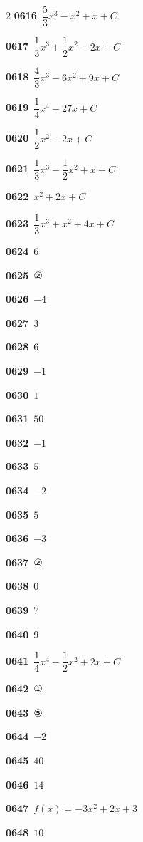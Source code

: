 \documentclass[10pt,a4paper]{article}
\begin{document}
\begin{multicols}{2}
\noindent\textbf{0616}\ $\dfrac{5}{3}x^3-x^2+x+C$\par
\noindent\textbf{0617}\ $\dfrac{1}{3}x^3+\dfrac{1}{2}x^2-2x+C$\par
\noindent\textbf{0618}\ $\dfrac{4}{3}x^3-6x^2+9x+C$\par
\noindent\textbf{0619}\ $\dfrac{1}{4}x^4-27x+C$\par
\noindent\textbf{0620}\ $\dfrac{1}{2}x^2-2x+C$\par
\noindent\textbf{0621}\ $\dfrac{1}{3}x^3-\dfrac{1}{2}x^2+x+C$\par
\noindent\textbf{0622}\ $x^2+2x+C$\par
\noindent\textbf{0623}\ $\dfrac{1}{3}x^3+x^2+4x+C$\par
\noindent\textbf{0624}\ $6$\par
\noindent\textbf{0625}\ ②\par
\noindent\textbf{0626}\ $-4$\par
\noindent\textbf{0627}\ $3$\par
\noindent\textbf{0628}\ $6$\par
\noindent\textbf{0629}\ $-1$\par
\noindent\textbf{0630}\ $1$\par
\noindent\textbf{0631}\ $50$\par
\noindent\textbf{0632}\ $-1$\par
\noindent\textbf{0633}\ $5$\par
\noindent\textbf{0634}\ $-2$\par
\noindent\textbf{0635}\ $5$\par
\noindent\textbf{0636}\ $-3$\par
\noindent\textbf{0637}\ ②\par
\noindent\textbf{0638}\ $0$\par
\noindent\textbf{0639}\ $7$\par
\noindent\textbf{0640}\ $9$\par
\noindent\textbf{0641}\ $\dfrac{1}{4}x^4-\dfrac{1}{2}x^2+2x+C$\par
\noindent\textbf{0642}\ ①\par
\noindent\textbf{0643}\ ⑤\par
\noindent\textbf{0644}\ $-2$\par
\noindent\textbf{0645}\ $40$\par
\noindent\textbf{0646}\ $14$\par
\noindent\textbf{0647}\ $f(x)=-3x^2+2x+3$\par
\noindent\textbf{0648}\ $10$\par

\end{multicols}
\end{document}
